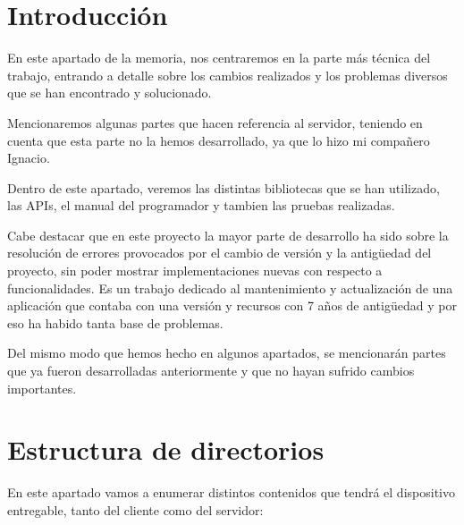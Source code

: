 
\section{Introducción}

En este apartado de la memoria, nos centraremos en la parte más técnica del trabajo, entrando a detalle sobre los cambios realizados y los problemas diversos que se han encontrado y solucionado.

Mencionaremos algunas partes que hacen referencia al servidor, teniendo en cuenta que esta parte no la hemos desarrollado, ya que lo hizo mi compañero Ignacio.

Dentro de este apartado, veremos las distintas bibliotecas que se han utilizado, las APIs, el manual del programador y tambien las pruebas realizadas. 

Cabe destacar que en este proyecto la mayor parte de desarrollo ha sido sobre la resolución de errores provocados por el cambio de versión y la antigüedad del proyecto, sin poder mostrar implementaciones nuevas con respecto a funcionalidades. Es un trabajo dedicado al mantenimiento y actualización de una aplicación que contaba con una versión y recursos con 7 años de antigüedad y por eso ha habido tanta base de problemas.

Del mismo modo que hemos hecho en algunos apartados, se mencionarán partes que ya fueron desarrolladas anteriormente y que no hayan sufrido cambios importantes.

\section{Estructura de directorios}

En este apartado vamos a enumerar distintos contenidos que tendrá el dispositivo entregable, tanto del cliente como del servidor:

